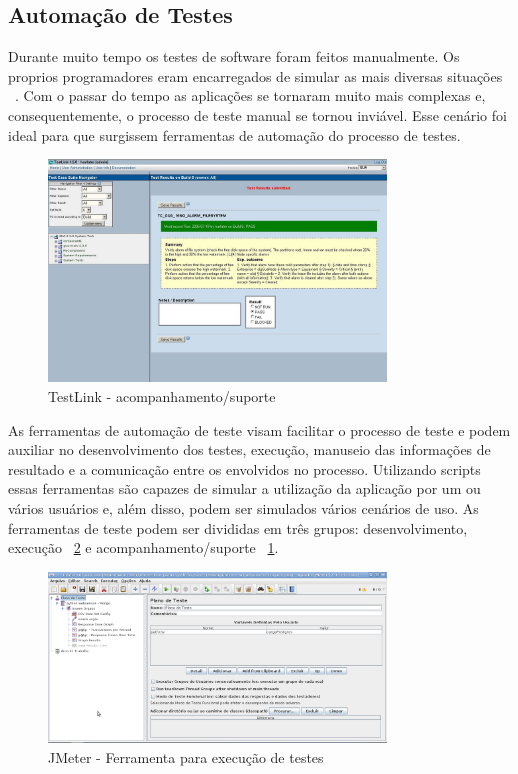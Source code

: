 \subsection{Automação de Testes}

Durante muito tempo os testes de software foram feitos manualmente. Os proprios programadores eram encarregados de simular as mais diversas situações ~\cite{rios2006teste}. Com o passar do tempo as aplicações se tornaram muito mais complexas e, consequentemente, o processo de teste manual se tornou inviável. Esse cenário foi ideal para que surgissem ferramentas de automação do processo de testes.

	\begin{figure}[!htbp]
		\begin{center}
			\includegraphics[width=0.8\textwidth]{testlink}
		\end{center}
		\caption{TestLink - acompanhamento/suporte}
		\label{fig:testlink}
	\end{figure}

As ferramentas de automação de teste visam facilitar o processo de teste e podem auxiliar no desenvolvimento dos testes, execução, manuseio das informações de resultado e a comunicação entre os envolvidos no processo. Utilizando scripts essas ferramentas são capazes de simular a utilização da aplicação por um ou vários usuários e, além disso, podem ser simulados vários cenários de uso. As ferramentas de teste podem ser divididas em três grupos: desenvolvimento, execução ~\ref{fig:jmeter} e acompanhamento/suporte ~\ref{fig:testlink}.

	\begin{figure}[!htbp]
		\begin{center}
			\includegraphics[width=0.8\textwidth]{jmeter}
		\end{center}
		\caption{JMeter - Ferramenta para execução de testes}
		\label{fig:jmeter}
	\end{figure}

